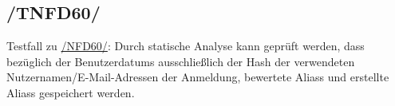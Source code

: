 \subsection*{/TNFD60/}
\label{/TNFD60/} Testfall zu \hyperref[/NFD60/]{/NFD60/}: Durch \gls{statische Analyse} kann geprüft werden, dass bezüglich der \Glspl{Benutzerdatum} ausschließlich der \Gls{Hash} der verwendeten Nutzernamen/E-Mail-Adressen der Anmeldung, bewertete \Glspl{Alias} und erstellte \Glspl{Alias} gespeichert werden.